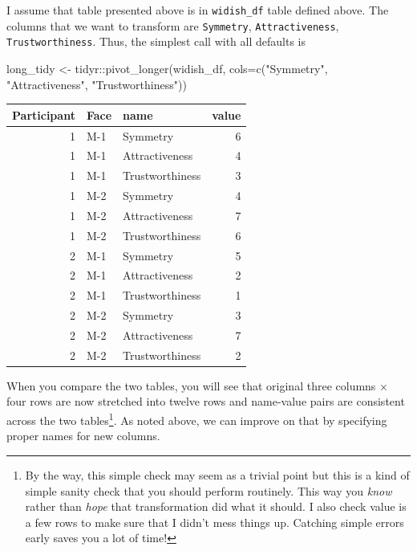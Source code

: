 \documentclass[
]{book}
\newenvironment{Shaded}{\begin{snugshade}}{\end{snugshade}}
\newcommand{\AttributeTok}[1]{\textcolor[rgb]{0.77,0.63,0.00}{#1}}
\newcommand{\FunctionTok}[1]{\textcolor[rgb]{0.00,0.00,0.00}{#1}}
\newcommand{\NormalTok}[1]{#1}
\newcommand{\OtherTok}[1]{\textcolor[rgb]{0.56,0.35,0.01}{#1}}
\newcommand{\SpecialCharTok}[1]{\textcolor[rgb]{0.00,0.00,0.00}{#1}}
\newcommand{\StringTok}[1]{\textcolor[rgb]{0.31,0.60,0.02}{#1}}
\begin{document}
I assume that table presented above is in \texttt{widish\_df} table defined above. The columns that we want to transform are \texttt{Symmetry}, \texttt{Attractiveness}, \texttt{Trustworthiness}. Thus, the simplest call with all defaults is

\begin{Shaded}
\begin{Highlighting}[]
\NormalTok{long\_tidy }\OtherTok{\textless{}{-}}\NormalTok{ tidyr}\SpecialCharTok{::}\FunctionTok{pivot\_longer}\NormalTok{(widish\_df, }
                               \AttributeTok{cols=}\FunctionTok{c}\NormalTok{(}\StringTok{"Symmetry"}\NormalTok{, }\StringTok{"Attractiveness"}\NormalTok{, }\StringTok{"Trustworthiness"}\NormalTok{))}
\end{Highlighting}
\end{Shaded}

\begin{tabular}{r|l|l|r}
\hline
Participant & Face & name & value\\
\hline
1 & M-1 & Symmetry & 6\\
\hline
1 & M-1 & Attractiveness & 4\\
\hline
1 & M-1 & Trustworthiness & 3\\
\hline
1 & M-2 & Symmetry & 4\\
\hline
1 & M-2 & Attractiveness & 7\\
\hline
1 & M-2 & Trustworthiness & 6\\
\hline
2 & M-1 & Symmetry & 5\\
\hline
2 & M-1 & Attractiveness & 2\\
\hline
2 & M-1 & Trustworthiness & 1\\
\hline
2 & M-2 & Symmetry & 3\\
\hline
2 & M-2 & Attractiveness & 7\\
\hline
2 & M-2 & Trustworthiness & 2\\
\hline
\end{tabular}

When you compare the two tables, you will see that original three columns × four rows are now stretched into twelve rows and name-value pairs are consistent across the two tables\footnote{By the way, this simple check may seem as a trivial point but this is a kind of simple sanity check that you should perform routinely. This way you \emph{know} rather than \emph{hope} that transformation did what it should. I also check value is a few rows to make sure that I didn't mess things up. Catching simple errors early saves you a lot of time!}. As noted above, we can improve on that by specifying proper names for new columns.
\end{document}
